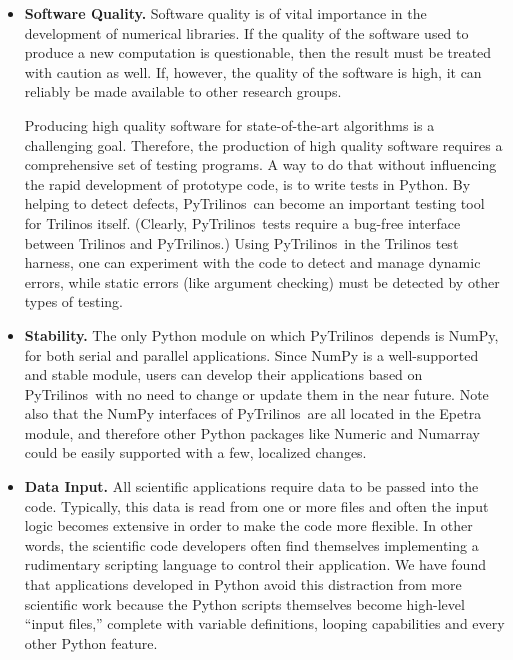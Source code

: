 \documentclass[acmtocl]{acmtrans2m}
\newcommand{\PyTrilinos}{{PyTrilinos}}
\begin{document}
\begin{itemize}
\item {\bf Software Quality.} Software quality is of vital importance
  in the development of numerical libraries.  If the quality of the
  software used to produce a new computation is questionable, then the
  result must be treated with caution as well.  If, however, the
  quality of the software is high, it can reliably be made available
  to other research groups.

  Producing high quality software for state-of-the-art algorithms is a
  challenging goal.  Therefore, the production of high quality
  software requires a comprehensive set of testing programs.  A way to
  do that without influencing the rapid development of prototype code,
  is to write tests in Python.  By helping to detect defects,
  \PyTrilinos\ can become an important testing tool for Trilinos itself.
  (Clearly, \PyTrilinos\ tests require a bug-free interface between
  Trilinos and \PyTrilinos.) Using \PyTrilinos\ in the Trilinos test
  harness, one can experiment with the code to detect and manage
  dynamic errors, while static errors (like argument checking) must be
  detected by other types of testing.

\item {\bf Stability.} The only Python module on which \PyTrilinos\ depends is
  NumPy, for both serial and parallel applications.  Since NumPy is a
  well-supported and stable module, users can develop their applications based
  on \PyTrilinos\ with no need to change or update them in the near future. Note
  also that the NumPy interfaces of \PyTrilinos\ are all located in the Epetra
  module, and therefore other Python packages like Numeric and Numarray could be
  easily supported with a few, localized changes.

\item {\bf Data Input.} All scientific applications require data to be
  passed into the code.  Typically, this data is read from one or more
  files and often the input logic becomes extensive in order to make
  the code more flexible.  In other words, the scientific code
  developers often find themselves implementing a rudimentary
  scripting language to control their application.  We have found that
  applications developed in Python avoid this distraction from more
  scientific work because the Python scripts themselves become
  high-level ``input files,'' complete with variable definitions,
  looping capabilities and every other Python feature.

\end{itemize}
\end{document}
